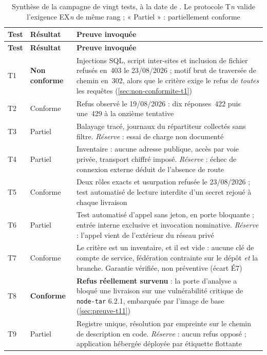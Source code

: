 {\footnotesize
\setlength{\tabcolsep}{3pt}
\begin{longtable}{|P{0.8cm}|P{1.55cm}|P{12.9cm}|}
\caption[Synthèse de la campagne de vingt tests]{Synthèse de la campagne de vingt tests, à la date de \dateref{}. Le protocole
T\emph{n} valide l'exigence EX\emph{n} de même rang ; « Partiel » : partiellement conforme}
\label{tab:synthese-campagne} \\
\hline
\textbf{Test} & \textbf{Résultat} & \textbf{Preuve invoquée} \\
\hline
\endfirsthead
\hline
\textbf{Test} & \textbf{Résultat} & \textbf{Preuve invoquée} \\
\hline
\endhead
T1 & \textbf{Non conforme} & Injections SQL, script inter-sites et inclusion de fichier
refusés en~403 le 23/08/2026 ; motif brut de traversée de chemin en~302, alors que le critère
exige le refus de \emph{toutes} les requêtes (\cref{sec:non-conformite-t1}) \\ \hline
T2 & Conforme & Refus observé le 19/08/2026 : dix réponses~422 puis une~429 à la onzième
tentative \\ \hline
T3 & Partiel & Balayage tracé, journaux du répartiteur collectés sans filtre.
\emph{Réserve} : essai de charge non documenté \\ \hline
T4 & Partiel & Inventaire : aucune adresse publique, accès par voie privée, transport
chiffré imposé. \emph{Réserve} : échec de connexion externe déduit de l'absence de route \\ \hline
T5 & Conforme & Deux rôles exacts et usurpation refusée le 23/08/2026 ; test automatisé de
lecture interdite d'un secret rejoué à chaque livraison \\ \hline
T6 & Partiel & Test automatisé d'appel sans jeton, en porte bloquante ; entrée interne
exclusive et invocation nominative. \emph{Réserve} : l'appel vient de l'extérieur du réseau
privé \\ \hline
T7 & Conforme & Le critère est un inventaire, et il est vide : aucune clé de compte de
service, fédération contrainte sur le dépôt \emph{et} la branche. Garantie vérifiée, non
préventive (écart É7) \\ \hline
T8 & \textbf{Conforme} & \textbf{Refus réellement survenu} : la porte d'analyse a bloqué une
livraison sur une vulnérabilité critique de \texttt{node-tar} 6.2.1, embarquée par l'image de base
(\cref{sec:preuve-t11}) \\ \hline
T9 & Partiel & Registre unique, résolution par empreinte sur le chemin de description en
code. \emph{Réserve} : aucun refus opposé ; application hébergée déployée par étiquette flottante

\end{longtable}}
